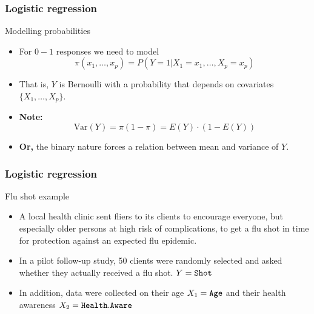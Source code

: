 \documentclass[handout]{beamer}
\begin{document}
   \begin{frame} \frametitle{Logistic regression}

   \begin{block}
       {Modelling probabilities}
       \begin{itemize}
       \item For $0-1$ responses we need to model
   $$
   \pi(x_1, \dots, x_p) = P(Y=1|X_1=x_1,\dots, X_p=x_p)
   $$

   \item That is, $Y$ is Bernoulli with a probability that
   depends on covariates $\{X_1, \dots, X_p\}$.

   \item {\bf Note:}
   $$
   \text{Var}(Y) = \pi ( 1 - \pi) = E(Y) \cdot ( 1-  E(Y))
   $$

   \item {\bf Or,} the binary nature forces a relation between
   mean and variance of $Y$.
       \end{itemize}
   \end{block}
   \end{frame}


   \begin{frame} \frametitle{Logistic regression}

   \begin{block}
       {Flu shot example}
       \begin{itemize}
       \item      A local health clinic sent fliers to its clients to encourage
        everyone, but especially older persons at high risk of
        complications, to get a flu shot in time for protection
        against an expected flu epidemic.


      \item      In a pilot follow-up study, 50 clients were randomly
        selected and asked whether they actually received a flu
        shot. $Y={\tt Shot}$


      \item      In addition, data were collected on their age $X_1={\tt Age}$ and their
        health awareness $X_2={\tt Health.Aware}$

       \end{itemize}

   \end{block}
   \end{frame}
\end{document}
